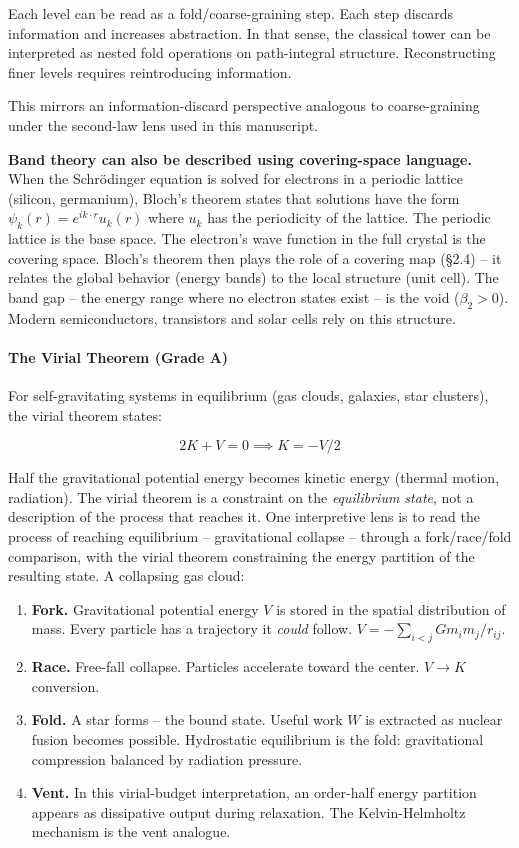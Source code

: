 \documentclass[
  11pt,
]{article}
\begin{document}
Each level can be read as a fold/coarse-graining step. Each step
discards information and increases abstraction. In that sense, the
classical tower can be interpreted as nested fold operations on
path-integral structure. Reconstructing finer levels requires
reintroducing information.

This mirrors an information-discard perspective analogous to
coarse-graining under the second-law lens used in this manuscript.

\textbf{Band theory can also be described using covering-space
language.} When the Schrödinger equation is solved for electrons in a
periodic lattice (silicon, germanium), Bloch's theorem states that
solutions have the form \(\psi_k(r) = e^{ik \cdot r} u_k(r)\) where
\(u_k\) has the periodicity of the lattice. The periodic lattice is the
base space. The electron's wave function in the full crystal is the
covering space. Bloch's theorem then plays the role of a covering map
(§2.4) -- it relates the global behavior (energy bands) to the local
structure (unit cell). The band gap -- the energy range where no
electron states exist -- is the void (\(\beta_2 > 0\)). Modern
semiconductors, transistors and solar cells rely on this structure.

\paragraph{The Virial Theorem (Grade
A)}\label{the-virial-theorem-grade-a}

For self-gravitating systems in equilibrium (gas clouds, galaxies, star
clusters), the virial theorem states:

\[
2K + V = 0 \implies K = -V/2
\]

Half the gravitational potential energy becomes kinetic energy (thermal
motion, radiation). The virial theorem is a constraint on the
\emph{equilibrium state}, not a description of the process that reaches
it. One interpretive lens is to read the process of reaching equilibrium
-- gravitational collapse -- through a fork/race/fold comparison, with
the virial theorem constraining the energy partition of the resulting
state. A collapsing gas cloud:

\begin{enumerate}
\def\labelenumi{\arabic{enumi}.}
\item
  \textbf{Fork.} Gravitational potential energy \(V\) is stored in the
  spatial distribution of mass. Every particle has a trajectory it
  \emph{could} follow. \(V = -\sum_{i<j} G m_i m_j / r_{ij}\).
\item
  \textbf{Race.} Free-fall collapse. Particles accelerate toward the
  center. \(V \to K\) conversion.
\item
  \textbf{Fold.} A star forms -- the bound state. Useful work \(W\) is
  extracted as nuclear fusion becomes possible. Hydrostatic equilibrium
  is the fold: gravitational compression balanced by radiation pressure.
\item
  \textbf{Vent.} In this virial-budget interpretation, an order-half
  energy partition appears as dissipative output during relaxation. The
  Kelvin-Helmholtz mechanism is the vent analogue.
\end{enumerate}
\end{document}
